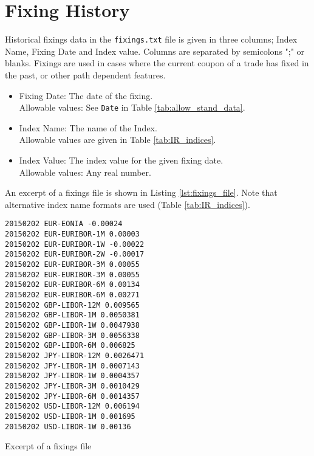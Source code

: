 \section{Fixing History}

Historical fixings data in the {\tt fixings.txt} file is given in
three columns;  Index Name,  Fixing Date and  Index value. Columns are
separated by semicolons ";" or blanks. Fixings are used in cases where the current coupon of a trade has fixed in the past, or other path dependent features.

\begin{itemize}

\item Fixing Date: The date of the fixing.  \\ Allowable values:  See \lstinline!Date! in Table \ref{tab:allow_stand_data}.

\item Index Name: The name of the Index. \\Allowable values are given
  in Table \ref{tab:IR_indices}. %

\item Index Value: The index value for the given fixing date. \\Allowable values: Any real number.
\end{itemize}

An excerpt of a fixings file is shown in Listing \ref{lst:fixings_file}. Note that alternative index name formats are used (Table \ref{tab:IR_indices}).

\begin{listing}[H]
\begin{verbatim}
20150202 EUR-EONIA -0.00024
20150202 EUR-EURIBOR-1M 0.00003
20150202 EUR-EURIBOR-1W -0.00022
20150202 EUR-EURIBOR-2W -0.00017
20150202 EUR-EURIBOR-3M 0.00055
20150202 EUR-EURIBOR-3M 0.00055
20150202 EUR-EURIBOR-6M 0.00134
20150202 EUR-EURIBOR-6M 0.00271
20150202 GBP-LIBOR-12M 0.009565
20150202 GBP-LIBOR-1M 0.0050381
20150202 GBP-LIBOR-1W 0.0047938
20150202 GBP-LIBOR-3M 0.0056338
20150202 GBP-LIBOR-6M 0.006825
20150202 JPY-LIBOR-12M 0.0026471
20150202 JPY-LIBOR-1M 0.0007143
20150202 JPY-LIBOR-1W 0.0004357
20150202 JPY-LIBOR-3M 0.0010429
20150202 JPY-LIBOR-6M 0.0014357
20150202 USD-LIBOR-12M 0.006194
20150202 USD-LIBOR-1M 0.001695
20150202 USD-LIBOR-1W 0.00136
\end{verbatim}
\caption{Excerpt of a fixings file}
\label{lst:fixings_file}  
\end{listing}

